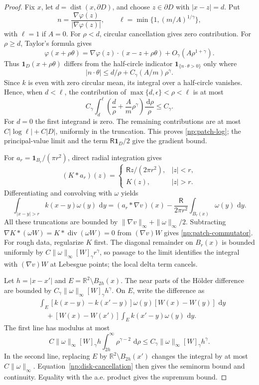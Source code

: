 \documentclass[11pt]{amsart}
\theoremstyle{remark}
\numberwithin{equation}{section}
\newcommand{\R}{\mathbb R}
\newcommand{\dd}{\,\mathrm d}
\begin{document}
\begin{proof}
Fix $x$, let $d=\operatorname{dist}(x,\partial D)$, and choose
$z\in\partial D$ with $|x-z|=d$. Put
\[
 n=\frac{\nabla\varphi(z)}{|\nabla\varphi(z)|},\qquad
 \ell=\min\{1,(m/A)^{1/\gamma}\},
\]
with $\ell=1$ if $A=0$. For $\rho<d$, circular cancellation gives
zero contribution. For $\rho\ge d$, Taylor's formula gives
\[
 \varphi(x+\rho\theta)=\nabla\varphi(z)\cdot(x-z+\rho\theta)
                  +O_\gamma(A\rho^{1+\gamma}).
\]
Thus $\mathbf1_D(x+\rho\theta)$ differs from the half-circle
indicator $\mathbf1_{\{n\cdot\theta>0\}}$ only where
\[
 |n\cdot\theta|\le d/\rho+C_\gamma(A/m)\rho^\gamma.
\]
Since $k$ is even with zero circular mean, its integral over a
half-circle vanishes. Hence, when $d<\ell$, the contribution of
$\max\{d,\epsilon\}<\rho<\ell$ is at most
\[
 C_\gamma\int_d^\ell
       \left(\frac d\rho+\frac A m\rho^\gamma\right)
       \frac{\dd\rho}{\rho}\le C_\gamma.
\]
For $d=0$ the first integrand is zero. The remaining contributions
are at most $C|\log\ell|+C|D|$, uniformly in the truncation.
This proves \eqref{np:patch-log}; the principal-value limit and
the term $\mathsf R\mathbf1_D/2$ give the gradient bound.

For $a_r=\mathbf1_{B_r}/(\pi r^2)$, direct radial integration gives
\[
 (K*a_r)(z)=
 \begin{cases}
 \mathsf Rz/(2\pi r^2),&|z|<r,\\
 K(z),&|z|>r.
 \end{cases}
\]
Differentiating and convolving with $\omega$ yields
\begin{equation}\label{np:disk-cancellation}
 \int_{|x-y|>r}k(x-y)\omega(y)\,\dd y
 =(a_r*\nabla v)(x)
       -\frac{\mathsf R}{2\pi r^2}\int_{B_r(x)}\omega(y)\,\dd y.
\end{equation}
All these truncations are bounded by
$\|\nabla v\|_\infty+\|\omega\|_\infty/2$.
Subtracting
$\nabla K*(\omega W)=K*\operatorname{div}(\omega W)=0$
from $(\nabla v)W$ gives \eqref{np:patch-commutator}.
For rough data, regularize $K$ first. The diagonal remainder on
$B_r(x)$ is bounded uniformly by
$C\|\omega\|_\infty[W]_\gamma r^\gamma$, so passage to the
limit identifies the integral with $(\nabla v)W$ at Lebesgue
points; the local delta term cancels.

Let $h=|x-x'|$ and $E=\R^2\setminus B_{2h}(x)$.
The near parts of the H\"older difference are bounded by
$C_\gamma\|\omega\|_\infty[W]_\gamma h^\gamma$.
On $E$, write the difference as
\[
 \begin{split}
 &\int_E[k(x-y)-k(x'-y)]\omega(y)[W(x)-W(y)]\,\dd y\\
 &\quad+[W(x)-W(x')]\int_Ek(x'-y)\omega(y)\,\dd y.
 \end{split}
\]
The first line has modulus at most
\[
 C\|\omega\|_\infty[W]_\gamma h
       \int_{2h}^\infty\rho^{\gamma-2}\,\dd\rho
 \le C_\gamma\|\omega\|_\infty[W]_\gamma h^\gamma.
\]
In the second line, replacing $E$ by
$\R^2\setminus B_{2h}(x')$ changes the integral by at most
$C\|\omega\|_\infty$. Equation~\eqref{np:disk-cancellation}
then gives the seminorm bound and continuity. Equality with
the a.e. product gives the supremum bound.
\end{proof}
\end{document}
